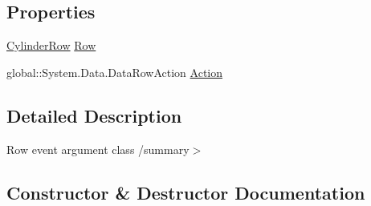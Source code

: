 \subsection*{Properties}
\begin{DoxyCompactItemize}
\item 
\hyperlink{class_env_int_1_1_win32_1_1_field_tech_1_1_manager_1_1_data_sets_1_1_guide_ware_mobile_data_set_1_1_cylinder_row}{Cylinder\+Row} \hyperlink{class_env_int_1_1_win32_1_1_field_tech_1_1_manager_1_1_data_sets_1_1_guide_ware_mobile_data_set_1_1_cylinder_row_change_event_a5d75dda9ce5f0eca218395bddd56c223}{Row}
\item 
global\+::\+System.\+Data.\+Data\+Row\+Action \hyperlink{class_env_int_1_1_win32_1_1_field_tech_1_1_manager_1_1_data_sets_1_1_guide_ware_mobile_data_set_1_1_cylinder_row_change_event_a6ee2d4d96548194ab5ff58bea8227785}{Action}
\end{DoxyCompactItemize}


\subsection{Detailed Description}
Row event argument class /summary$>$ 

\subsection{Constructor \& Destructor Documentation}
\hypertarget{class_env_int_1_1_win32_1_1_field_tech_1_1_manager_1_1_data_sets_1_1_guide_ware_mobile_data_set_1_1_cylinder_row_change_event_a75a38c69ad337b5c13fa447a4200e5f8}{}

